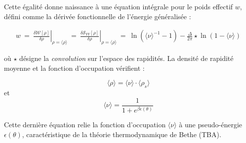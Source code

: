 Cette égalité donne naissance à une équation intégrale pour le poids effectif \( w \), défini comme la dérivée fonctionnelle de l'énergie généralisée :

\begin{eqnarray*}
	w ~=~ \left. \frac{\delta \mathcal{W}[\rho]}{\delta \rho} \right|_{\rho = \langle \rho \rangle } ~= ~\left. \frac{\delta \mathcal{S}_{YY}[\rho]}{\delta \rho} \right|_{\rho = \langle \rho \rangle } ~=~ \ln ( \langle \nu \rangle^{-1}  - 1 ) - \frac{\Delta}{2\pi} \star \ln ( 1 -  \langle \nu \rangle )
\end{eqnarray*}

où \( \star \) désigne la \textit{convolution} sur l’espace des rapidités. La densité de rapidité moyenne et la fonction d’occupation vérifient :

\begin{equation}
\langle \rho \rangle = \langle \nu \rangle \cdot \langle \rho_s \rangle
\end{equation}
et
\begin{equation}
\langle \nu \rangle = \frac{1}{1 + e^{\beta \epsilon(\theta)}}
\end{equation}

Cette dernière équation relie la fonction d’occupation \( \langle \nu \rangle \) à une pseudo-énergie \( \epsilon(\theta) \), caractéristique de la théorie thermodynamique de Bethe (TBA).